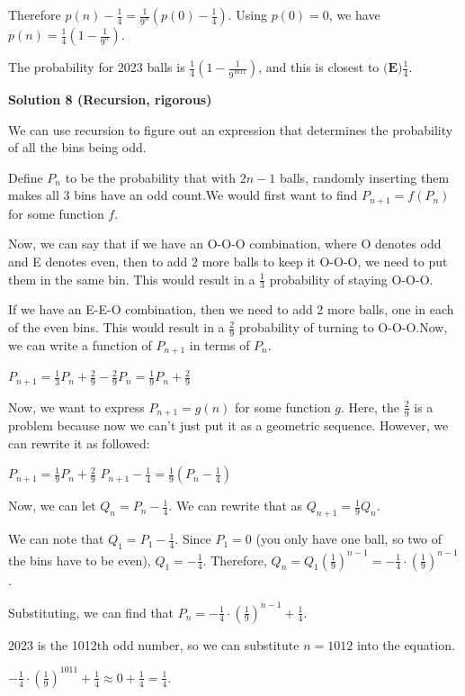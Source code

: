 \begin{enumerate}
 Therefore $p(n)-\frac{1}{4} = \frac{1}{9^n} (p(0) - \frac{1}{4})$. Using $p(0)=0$, we have $p(n)=\frac{1}{4} (1 - \frac{1}{9^n})$.

 The probability for 2023 balls is $\frac{1}{4} (1 - \frac{1}{9^{1011}})$, and this is closest to $\boxed{\textbf{(E)} \frac{1}{4}}$.

 



\textbf{Solution 8 (Recursion, rigorous)}

We can use recursion to figure out an expression that determines the probability of all the bins being odd.

 Define $P_n$ to be the probability that with $2n-1$ balls, randomly inserting them makes all 3 bins have an odd count.We would first want to find $P_{n+1}=f(P_n)$ for some function $f$.

 Now, we can say that if we have an O-O-O combination, where O denotes odd and E denotes even, then to add 2 more balls to keep it O-O-O, we need to put them in the same bin. This would result in a $\frac{1}{3}$ probability of staying O-O-O.

 If we have an E-E-O combination, then we need to add 2 more balls, one in each of the even bins. This would result in a $\frac{2}{9}$ probability of turning to O-O-O.Now, we can write a function of $P_{n+1}$ in terms of $P_n$.

 $P_{n+1}=\frac{1}{3}P_n+\frac{2}{9}-\frac{2}{9}P_n=\frac{1}{9}P_n+\frac{2}{9}$

 Now, we want to express $P_{n+1}=g(n)$ for some function $g$. Here, the $\frac{2}{9}$ is a problem because now we can't just put it as a geometric sequence. However, we can rewrite it as followed:

 $P_{n+1}=\frac{1}{9}P_n+\frac{2}{9}$
$P_{n+1}-\frac{1}{4}=\frac{1}{9}(P_n-\frac{1}{4})$

 
Now, we can let $Q_n=P_n-\frac{1}{4}$. We can rewrite that as $Q_{n+1}=\frac{1}{9}Q_n$.

 We can note that $Q_1=P_1-\frac{1}{4}$. Since $P_1=0$ (you only have one ball, so two of the bins have to be even), $Q_1=-\frac{1}{4}$. Therefore, $Q_n=Q_1(\frac{1}{9})^{n-1}=-\frac{1}{4} \cdot (\frac{1}{9})^{n-1}$.

 Substituting, we can find that $P_n=-\frac{1}{4} \cdot (\frac{1}{9})^{n-1}+\frac{1}{4}$.

 2023 is the 1012th odd number, so we can substitute $n=1012$ into the equation.

 $-\frac{1}{4} \cdot (\frac{1}{9})^{1011}+\frac{1}{4} \approx 0+\frac{1}{4}=\frac{1}{4}$.


\end{enumerate}
